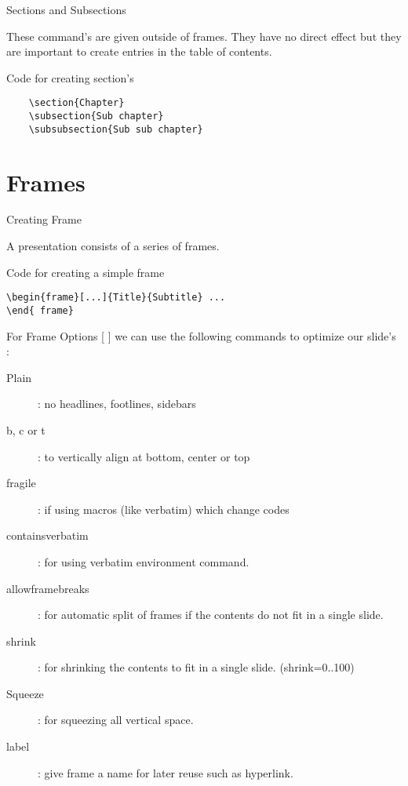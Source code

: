 \documentclass[10pt,xcolor=x11names]{beamer}
\begin{document}
\begin{frame}[fragile]{Sections and Subsections}

These command's are given outside of frames. They have
no direct effect but they are important to create entries in the table of contents.

\begin{exampleblock}{Code for creating section's }
	\begin{verbatim}
	\section{Chapter}
	\subsection{Sub chapter}
	\subsubsection{Sub sub chapter}
	\end{verbatim}
\end{exampleblock}
\end{frame}

\section{Frames}
\begin{frame}[fragile]{Creating Frame}

A presentation consists of a series of frames.

\begin{exampleblock}{Code for creating a simple frame}
\begin{verbatim}
\begin{frame}[...]{Title}{Subtitle} ... 
\end{ frame}
\end{verbatim}
\end{exampleblock}


For Frame Options [ ] we can use the following commands to optimize our slide's :
{\footnotesize 
\begin{description}
	\item[Plain]: no headlines, footlines, sidebars
	\item [b, c or t]: to vertically align at bottom, center or top
	\item [fragile]: if using macros (like verbatim) which change codes
	\item [containsverbatim]: for using verbatim environment command.
	\item [allowframebreaks] : for automatic split of frames if the contents
	do not fit in a single slide.
	\item [shrink]: for shrinking the contents to fit in a single slide. (shrink=0..100)
	\item [Squeeze]: for squeezing all vertical space.
	\item[label]: give frame a name for later reuse such as hyperlink.
\end{description}}

\end{frame}
\end{document}
